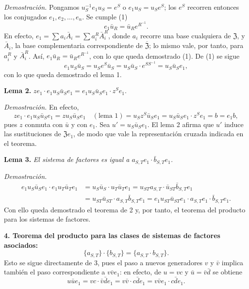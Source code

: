 \noindent\emph{Demostración.} Pongamos \(u_S^{-1}e_1u_S=e^S\) o \(e_1u_S=u_Se^S\); los \(e^S\) recorren entonces los conjugados \(e_1,e_2,\ldots,e_n\). Se cumple (1)
\[
e_1\bar u_R=\bar u_Re^{R^{-1}}.
\]
En efecto, \(e_1=\sum a_i\bar A_i=\sum a_i^R\bar A_i^R\), donde \(a_i\) recorre una base cualquiera de \(\mathfrak Z\), y \(\bar A_i\), la base complementaria correspondiente de \(\overline{\mathfrak Z}\); lo mismo vale, por tanto, para \(a_i^R\) y \(\bar A_i^R\). Así, \(e_1\bar u_R=\bar u_Re^{R^{-1}}\), con lo que queda demostrado (1). De (1) se sigue
\[
e_1u_S\bar u_S=u_Se^S\bar u_S=u_S\bar u_S\cdot e^{SS^{-1}}=u_S\bar u_Se_1,
\]
con lo que queda demostrado el lema 1.

\noindent\textbf{Lema 2.} \(ze_1\cdot e_1u_S\bar u_Se_1=e_1u_S\bar u_Se_1\cdot z^Se_1\).

\noindent\emph{Demostración.} En efecto,
\[
ze_1\cdot e_1u_S\bar u_Se_1
=zu_S\bar u_Se_1\quad(\text{lema 1})
=u_Sz^S\bar u_Se_1
=u_S\bar u_Se_1\cdot z^Se_1
=b=e_1b,
\]
pues \(z\) conmuta con \(\bar u\) y con \(e_1\). Sea \(u'=u_S\bar u_Se_1\). El lema 2 afirma que \(u'\) induce las sustituciones de \(\mathfrak Ze_1\), de modo que vale la representación cruzada indicada en el teorema.

\noindent\textbf{Lema 3.} \emph{El sistema de factores es igual a \(a_{S,T}e_1\cdot\bar b_{S,T}e_1\).}

\noindent\emph{Demostración.}
\[
\begin{aligned}
e_1u_S\bar u_Se_1\cdot e_1u_T\bar u_Te_1
&=u_S\bar u_S\cdot u_T\bar u_Te_1
 =u_{ST}a_{S,T}\cdot\bar u_{ST}\bar b_{S,T}e_1\\
&=u_{ST}\bar u_{ST}\cdot a_{S,T}\bar b_{S,T}e_1
 =e_1u_{ST}\bar u_{ST}e_1\cdot a_{S,T}e_1\cdot\bar b_{S,T}e_1.
\end{aligned}
\]
Con ello queda demostrado el teorema de 2 y, por tanto, el teorema del producto para los sistemas de factores.

\noindent\textbf{4. Teorema del producto para las clases de sistemas de factores asociados:}
\[
\{a_{S,T}\}\cdot\{b_{S,T}\}=\{a_{S,T}\cdot b_{S,T}\}.
\]
Esto se sigue directamente de 3, pues el paso a nuevos generadores \(v\) y \(\bar v\) implica también el paso correspondiente a \(v\bar ve_1\): en efecto, de \(u=vc\) y \(\bar u=\bar v\bar d\) se obtiene
\[
u\bar ue_1=vc\cdot\bar v\bar de_1=v\bar v\cdot c\bar de_1=v\bar ve_1\cdot c\bar de_1.
\]


